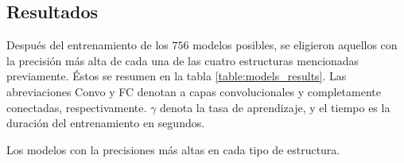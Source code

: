 \subsection{Resultados}

Después del entrenamiento de los $756$ modelos posibles,
se eligieron aquellos con la precisión más alta de cada una de las cuatro estructuras mencionadas previamente. Éstos se resumen en la tabla \ref{table:models_results}. Las abreviaciones Convo y FC denotan
a capas convolucionales y completamente conectadas, respectivamente.
$\gamma$ denota la tasa de aprendizaje, y el tiempo es la duración
del entrenamiento en segundos.

\begin{table}[!h]
\centering
\caption{Los modelos con la precisiones más altas en cada tipo de
estructura.\label{table:models_results}}


\end{table}
